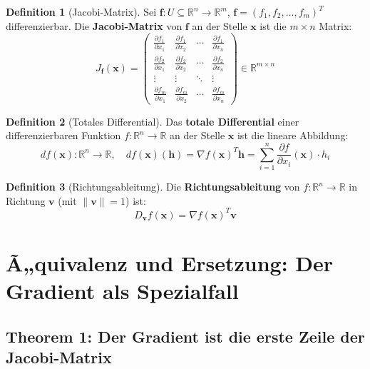 ﻿\documentclass[a4paper,12pt]{article}
\theoremstyle{definition}
\newtheorem{definition}{Definition}
\begin{document}
\begin{definition}[Jacobi-Matrix]
	Sei $\boldsymbol{f}: U \subseteq \mathbb{R}^n \to \mathbb{R}^m$, $\boldsymbol{f} = (f_1, f_2, \ldots, f_m)^T$ differenzierbar. Die \textbf{Jacobi-Matrix} von $\boldsymbol{f}$ an der Stelle $\boldsymbol{x}$ ist die $m \times n$ Matrix:
	\[
	J_{\boldsymbol{f}}(\boldsymbol{x}) = \begin{pmatrix}
		\frac{\partial f_1}{\partial x_1} & \frac{\partial f_1}{\partial x_2} & \cdots & \frac{\partial f_1}{\partial x_n} \\
		\frac{\partial f_2}{\partial x_1} & \frac{\partial f_2}{\partial x_2} & \cdots & \frac{\partial f_2}{\partial x_n} \\
		\vdots & \vdots & \ddots & \vdots \\
		\frac{\partial f_m}{\partial x_1} & \frac{\partial f_m}{\partial x_2} & \cdots & \frac{\partial f_m}{\partial x_n}
	\end{pmatrix} \in \mathbb{R}^{m \times n}
	\]
\end{definition}

\begin{definition}[Totales Differential]
	Das \textbf{totale Differential} einer differenzierbaren Funktion $f: \mathbb{R}^n \to \mathbb{R}$ an der Stelle $\boldsymbol{x}$ ist die lineare Abbildung:
	\[
	df(\boldsymbol{x}): \mathbb{R}^n \to \mathbb{R}, \quad df(\boldsymbol{x})(\boldsymbol{h}) = \nabla f(\boldsymbol{x})^T \boldsymbol{h} = \sum_{i=1}^n \frac{\partial f}{\partial x_i}(\boldsymbol{x}) \cdot h_i
	\]
\end{definition}

\begin{definition}[Richtungsableitung]
	Die \textbf{Richtungsableitung} von $f: \mathbb{R}^n \to \mathbb{R}$ in Richtung $\boldsymbol{v}$ (mit $\|\boldsymbol{v}\| = 1$) ist:
	\[
	D_{\boldsymbol{v}} f(\boldsymbol{x}) = \nabla f(\boldsymbol{x})^T \boldsymbol{v}
	\]
\end{definition}

\section{Ã„quivalenz und Ersetzung: Der Gradient als Spezialfall}

\subsection{Theorem 1: Der Gradient ist die erste Zeile der Jacobi-Matrix}
\end{document}
